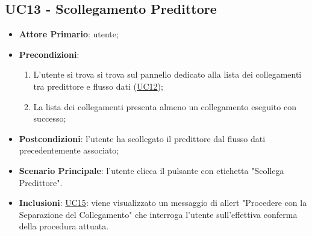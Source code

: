 	\subsection{UC13 - Scollegamento Predittore}
		\begin{itemize}
			\item\textbf{Attore Primario}: utente;
			\item\textbf{Precondizioni}: 
				\begin{enumerate}
					\item L'utente si trova si trova sul pannello dedicato alla lista dei collegamenti tra predittore e flusso dati (\hyperref[par:UC12]{UC12});
					\item La lista dei collegamenti presenta almeno un collegamento eseguito con successo;
				\end{enumerate}
			\item\textbf{Postcondizioni}: l’utente ha scollegato il predittore dal flusso dati precedentemente associato; 
			\item\textbf{Scenario Principale}: l'utente clicca il pulsante con etichetta "Scollega Predittore".
			\item\textbf{Inclusioni}: \hyperref[par:UC15]{UC15}: viene visualizzato un messaggio di allert "Procedere con la Separazione del Collegamento" che interroga l'utente sull'effettiva conferma della procedura attuata. 
		\end{itemize}


\label{par:UC14}
